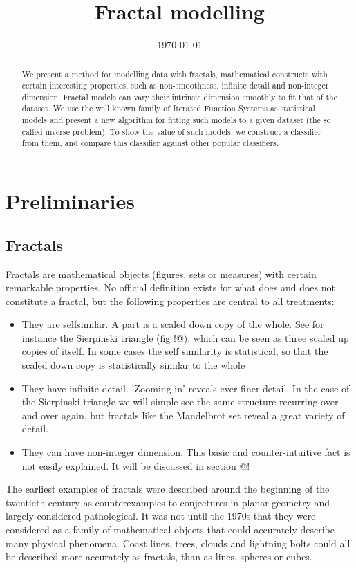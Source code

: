 \documentclass{article}
\title{Fractal modelling}
\date{\today}
\theoremstyle{definition}
\begin{document}
\maketitle

\begin{abstract}
We present a method for modelling data with fractals, mathematical constructs with certain interesting properties, such as non-smoothness, infinite detail and non-integer dimension. Fractal models can vary their intrinsic dimension smoothly to fit that of the dataset. We use the well known family of Iterated Function Systems as statistical models and present a new algorithm for fitting such models to a given dataset (the so called inverse problem). To show the value of such models, we construct a classifier from them, and compare this classifier against other popular classifiers.
\end{abstract}


\section{Preliminaries}
\subsection{Fractals}

Fractals are mathematical objects (figures, sets or measures) with certain remarkable properties. No official definition exists for what does and does not constitute a fractal, but the following properties are central to all treatments:
\begin{itemize}
  \item They are selfsimilar. A part is a scaled down copy of the whole. See for instance the Sierpinski triangle (fig !@), which can be seen as three scaled up copies of itself. In some cases the self similarity is statistical, so that the scaled down copy is statistically similar to the whole
  \item They have infinite detail. 'Zooming in' reveals ever finer detail. In the case of the Sierpinski triangle we will simple see the same structure recurring over and over again, but fractals like the Mandelbrot set reveal a great variety of detail.
  \item They can have non-integer dimension. This basic and counter-intuitive fact is not easily explained. It will be discussed in section @! 
\end{itemize}

The earliest examples of fractals were described around the beginning of the twentieth century as counterexamples to conjectures in planar geometry and largely considered pathological. It was not until the 1970s that they were considered as a family of mathematical objects that could accurately describe many physical phenomena. Coast lines, trees, clouds and lightning bolts could all be described more accurately as fractals, than as lines, spheres or cubes.
\end{document}
